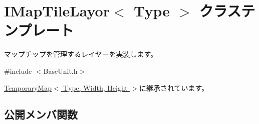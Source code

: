\hypertarget{class_i_map_tile_layor}{}\section{I\+Map\+Tile\+Layor$<$ Type $>$ クラステンプレート}
\label{class_i_map_tile_layor}


マップチップを管理するレイヤーを実装します。 




{\ttfamily \#include $<$Base\+Unit.\+h$>$}



\hyperlink{class_temporary_map}{Temporary\+Map$<$ Type, Width, Height $>$}に継承されています。

\subsection*{公開メンバ関数}
